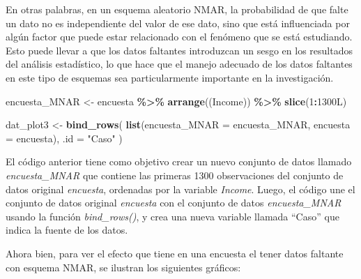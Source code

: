 \documentclass[
  12pt,
]{book}
\newenvironment{Shaded}{\begin{snugshade}}{\end{snugshade}}
\newcommand{\AttributeTok}[1]{\textcolor[rgb]{0.13,0.29,0.53}{#1}}
\newcommand{\DataTypeTok}[1]{\textcolor[rgb]{0.13,0.29,0.53}{#1}}
\newcommand{\DecValTok}[1]{\textcolor[rgb]{0.00,0.00,0.81}{#1}}
\newcommand{\FloatTok}[1]{\textcolor[rgb]{0.00,0.00,0.81}{#1}}
\newcommand{\FunctionTok}[1]{\textcolor[rgb]{0.13,0.29,0.53}{\textbf{#1}}}
\newcommand{\NormalTok}[1]{#1}
\newcommand{\OtherTok}[1]{\textcolor[rgb]{0.56,0.35,0.01}{#1}}
\newcommand{\SpecialCharTok}[1]{\textcolor[rgb]{0.81,0.36,0.00}{\textbf{#1}}}
\newcommand{\StringTok}[1]{\textcolor[rgb]{0.31,0.60,0.02}{#1}}
\begin{document}
En otras palabras, en un esquema aleatorio NMAR, la probabilidad de que falte un dato no es independiente del valor de ese dato, sino que está influenciada por algún factor que puede estar relacionado con el fenómeno que se está estudiando. Esto puede llevar a que los datos faltantes introduzcan un sesgo en los resultados del análisis estadístico, lo que hace que el manejo adecuado de los datos faltantes en este tipo de esquemas sea particularmente importante en la investigación.

\begin{Shaded}
\begin{Highlighting}[]
\NormalTok{encuesta\_MNAR }\OtherTok{\textless{}{-}}\NormalTok{ encuesta }\SpecialCharTok{\%\textgreater{}\%} 
  \FunctionTok{arrange}\NormalTok{((Income)) }\SpecialCharTok{\%\textgreater{}\%} 
  \FunctionTok{slice}\NormalTok{(}\DecValTok{1}\SpecialCharTok{:}\DecValTok{1300}\DataTypeTok{L}\NormalTok{)}

\NormalTok{dat\_plot3 }\OtherTok{\textless{}{-}} \FunctionTok{bind\_rows}\NormalTok{(}
  \FunctionTok{list}\NormalTok{(}\AttributeTok{encuesta\_MNAR =}\NormalTok{ encuesta\_MNAR,}
       \AttributeTok{encuesta =}\NormalTok{ encuesta), }\AttributeTok{.id =} \StringTok{"Caso"}\NormalTok{  )}
\end{Highlighting}
\end{Shaded}

El código anterior tiene como objetivo crear un nuevo conjunto de datos llamado \emph{encuesta\_MNAR} que contiene las primeras 1300 observaciones del conjunto de datos original \emph{encuesta}, ordenadas por la variable \emph{Income}. Luego, el código une el conjunto de datos original \emph{encuesta} con el conjunto de datos \emph{encuesta\_MNAR} usando la función \emph{bind\_rows()}, y crea una nueva variable llamada ``Caso'' que indica la fuente de los datos.

Ahora bien, para ver el efecto que tiene en una encuesta el tener datos faltante con esquema NMAR, se ilustran los siguientes gráficos:

\begin{Shaded}
\end{Shaded}
\end{document}
